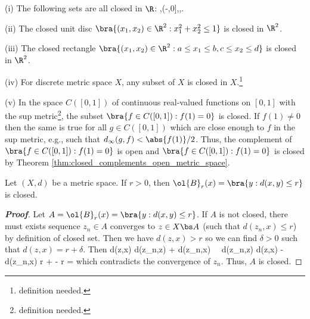 \begin{example}
\ben
\item [(i)] The following sets are all closed in $\R$:
\be
[a,b],\quad (-\infty,0],\quad {},\quad {}\cup{}.
\ee

\item [(ii)] The closed unit disc $\bra{(x_1,x_2)\in \R^2: x_1^2 + x_2^2 \leq 1}$ is closed in $\R^2$.

\item [(iii)] The closed rectangle $\bra{(x_1,x_2)\in \R^2: a\leq x_1 \leq b, c\leq x_2 \leq d}$ is closed in $\R^2$.

\item [(iv)] For discrete metric space $X$, any subset of $X$ is closed in $X$.\footnote{definition needed.}

\item [(v)] In the space $C([0,1])$ of continuous real-valued functions on $[0,1]$ with the sup metric\footnote{definition needed.}, the subset $\bra{f\in C([0,1]): f(1) =0}$ is closed. If $f(1)\neq 0$ then the same is true for all $g\in C([0,1])$ which are close enough to $f$ in the sup metric, e.g., such that $d_\infty(g,f) < \abs{f(1)}/2$. Thus, the complement of $\bra{f\in C([0,1]): f(1) =0}$ is open and $\bra{f\in C([0,1]): f(1) =0}$ is closed by Theorem \ref{thm:closed_complements_open_metric_space}.
\een
\end{example}

\begin{theorem}\label{thm:closed_ball_properties}%
Let $(X,d)$ be a metric space. If $r>0$, then $\ol{B}_r(x)=\bra{y:d(x,y)\leq r}$ is closed.
\end{theorem}

\begin{proof}[\bf Proof]
Let $A = \ol{B}_r(x)=\bra{y:d(x,y)\leq r}$. If $A$ is not closed, there must exists sequence $z_n\in A$ converges to $z\in X\bs A$ (such that $d(z_n,x)\leq r$) by definition of closed set. Then we have $d(z,x) > r$ so we can find $\delta >0$ such that $d(z,x)  = r + \delta$. Then
\be
d(z,x) \leq d(z_n,z) + d(z_n,x) \ \ra\ d(z_n,z) \geq d(z,x) - d(z_n,x) \geq r + \delta - r = \delta
\ee
which contradicts the convergence of $z_n$. Thus, $A$ is closed.
\end{proof}



